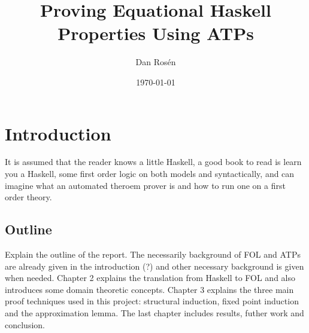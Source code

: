 \documentclass{book}
\begin{document}
\title{Proving Equational Haskell Properties Using ATPs}
\author{Dan Rosén}
\date{\today}
\maketitle


\newpage
{}




\newpage
\tableofcontents
{}

\newpage
\setcounter{page}{1}

\chapter{Introduction}



It is assumed that the reader knows a little Haskell, a good book to
read is learn you a Haskell, some first order logic on both models and
syntactically, and can imagine what an automated theroem prover is and
how to run one on a first order theory.



\section{Outline}

Explain the outline of the report.  The necessarily background of FOL
and ATPs are already given in the introduction (?) and other
necessary background is given when needed.
Chapter 2 explains the translation from Haskell to FOL and also
introduces some domain theoretic concepts. Chapter 3 explains the
three main proof techniques used in this project: structural
induction, fixed point induction and the approximation lemma. The last
chapter includes results, futher work and conclusion.
\end{document}
